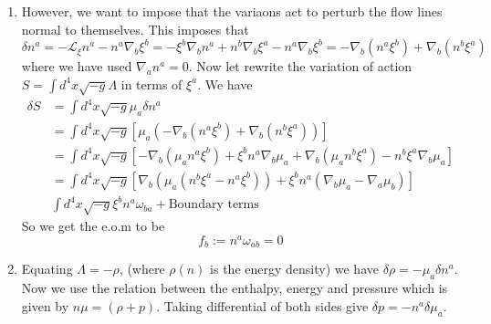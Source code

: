 \documentclass[10pt]{article}
\begin{document}
\begin{enumerate}
\item However, we want to impose that the variaons act to perturb the flow lines normal to themselves. This imposes that
  \begin{equation}
    \label{eq:delta-na}
    \delta n^a = -\mathcal{L}_{\xi} n^a - n^a \nabla_b \xi^b = - \xi^b \nabla_b n^a + n^b\nabla_b \xi^a - n^a \nabla_b \xi^b = - \nabla_b(n^a \xi^b) + \nabla_b(n^b \xi^a)
  \end{equation}
  where we have used $\nabla_a n^a = 0$. Now let rewrite the variation of action $S = \int d^4x \sqrt{-g} \Lambda$ in terms of $\xi^a$. We have
  \begin{align}
    \label{eq:variation-of-action-with-xi}
    \delta S
    & = \int d^4x \sqrt{-g} \mu_a \delta n^a \\
    & = \int d^4x \sqrt{-g}\left[\mu_a \left(- \nabla_b(n^a \xi^b) + \nabla_b(n^b \xi^a)\right)\right]\\
    & = \int d^4x \sqrt{-g} \left[-\nabla_b(\mu_a n^a \xi^b) + \xi^b n^a \nabla_b \mu_a + \nabla_b(\mu_a n^b \xi^a) - n^b\xi^a \nabla_b \mu_a\right]\\
    & = \int d^4x \sqrt{-g} \left[\nabla_b(\mu_a(n^b\xi^a - n^a\xi^b)) + \xi^b n^a(\nabla_b \mu_a-\nabla_a\mu_b)\right]\\
    & \int d^4x \sqrt{-g} \xi^b n^a \omega_{ba} + \textrm{Boundary terms}
  \end{align}
  So we get the e.o.m to be
  \begin{equation}
    \label{eq:eom-single}
    \boxed{f_b := n^a\omega_{ab} = 0}
  \end{equation}

\item Equating $\Lambda = -\rho$, (where $\rho (n)$ is the energy density) we have $\delta \rho = - \mu_a \delta n^a$. Now we use the relation between the enthalpy, energy and pressure which is given by $n \mu = (\rho + p)$. Taking differential of both sides give $\boxed{\delta p = - n^a \delta \mu_a}$.


\end{enumerate}
\end{document}
